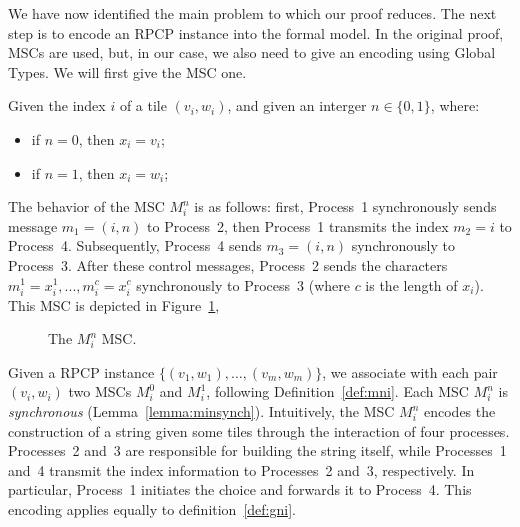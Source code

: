 \bigskip

We have now identified the main problem to which our proof reduces.  
The next step is to encode an RPCP instance into the formal model.
In the original proof, MSCs are used, but, in our case, we also need to give
an encoding using Global Types. We will first give the MSC one.

\bigskip

\begin{definition}[$M^n_i$]\label{def:mni}
	Given the index $i$ of a tile $(v_i, w_i)$, and
	given an interger $n\in\{0,1\}$, where:
	\begin{itemize}
		\item if $n=0$, then $x_i=v_i$;
		\item if $n=1$, then $x_i=w_i$;
	\end{itemize}
	The behavior of the MSC $M^n_i$ is as follows:
	first, Process~1 synchronously sends message
	$m_1 = (i, n)$ to Process~2, then Process~1 transmits the index $m_2=i$
	to Process~4. Subsequently, Process~4 sends $m_3 = (i, n)$
	synchronously to Process~3. After these control messages, Process~2
	sends the characters $m_i^1 = x_i^1,..., m_i^c = x_i^c$
	synchronously to Process~3 (where $c$ is the length of $x_i$).
	This MSC is depicted in Figure~\ref{fig:mni}, 

	\begin{figure}[!ht]
		\centering
		\begin{msc}[draw frame=none, draw head=none, msc keyword=, head height=0px, label distance=0.5ex, foot height=0px, foot distance=0px]{}

		\end{msc}
		\caption{The $M_i^n$ MSC.}
		\label{fig:mni}
	\end{figure}

\end{definition}

Given a RPCP instance $\{(v_1,w_1),\ldots,(v_m,w_m)\}$, we associate  
with each pair $(v_i,w_i)$ two MSCs $M^0_i$ and $M^1_i$, following  
Definition~\ref{def:mni}. Each MSC $M^n_i$ is \emph{synchronous}  
(Lemma~\ref{lemma:minsynch}). Intuitively, the MSC $M_i^n$ encodes the  
construction of a string given some tiles through the interaction of four processes.  
Processes~2 and~3 are responsible for building the string itself,  
while Processes~1 and~4 transmit the index information to Processes~2  
and~3, respectively. In particular, Process~1 initiates the choice and  
forwards it to Process~4. This encoding applies equally to definition~\ref{def:gni}.

